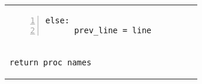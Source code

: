 \documentclass[10pt, a4paper]{article}
\begin{document}
\begin{tabular}{@{}ll@{}}
{\noindent\hspace*{0.35em}\begin{lstlisting}[numbers=left, firstnumber=last]
    else:
      prev_line = line
\end{lstlisting}}
&\\
{\noindent\hspace*{0.35em}\begin{lstlisting}[firstnumber=last]
  return proc_names
\end{lstlisting}}

\end{tabular}
\end{document}

